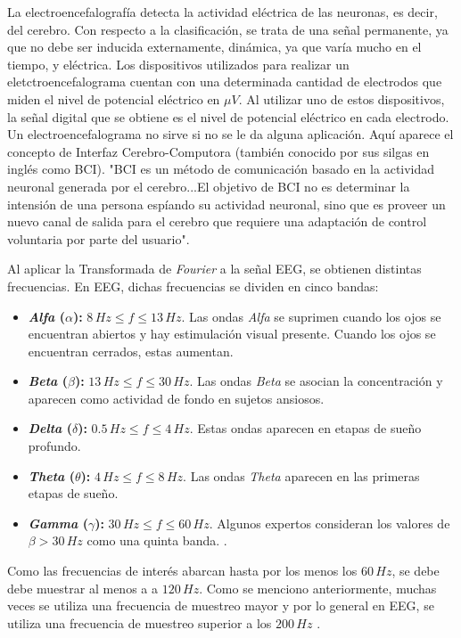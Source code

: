 La electroencefalografía detecta la actividad eléctrica de las neuronas, es decir, del cerebro. Con respecto a la clasificación, se trata de una señal permanente, ya que no debe ser inducida externamente, dinámica, ya que varía mucho en el tiempo, y eléctrica. Los dispositivos utilizados para realizar un eletctroencefalograma cuentan con una determinada cantidad de electrodos que miden el nivel de potencial eléctrico en $ \mu V$. Al utilizar uno de estos dispositivos, la señal digital que se obtiene es el nivel de potencial eléctrico en cada electrodo. Un electroencefalograma no sirve si no se le da alguna aplicación. Aquí aparece el concepto de Interfaz Cerebro-Computora (también conocido por sus silgas en inglés como BCI). "BCI es un método de comunicación basado en la actividad neuronal generada por el cerebro...El objetivo de BCI no es determinar la intensión de una persona espíando su actividad neuronal, sino que es proveer un nuevo canal de salida para el cerebro que requiere una adaptación de control voluntaria por parte del usuario"\cite{neural-eng}.

Al aplicar la Transformada de \emph{Fourier} a la señal EEG, se obtienen distintas frecuencias. En EEG, dichas frecuencias se dividen en cinco bandas:

\begin{itemize}
 \item \textbf{\emph{Alfa} ($\alpha$):} $ 8 \, Hz \leq f \leq 13 \, Hz$. Las ondas \emph{Alfa} se suprimen cuando los ojos se encuentran abiertos y hay estimulación visual presente. Cuando los ojos se encuentran cerrados, estas aumentan.
 \item \textbf{\emph{Beta} ($\beta$):} $ 13 \, Hz \leq f \leq 30 \, Hz$. Las ondas \emph{Beta} se asocian la concentración y aparecen como actividad de fondo en sujetos ansiosos. 
 \item \textbf{\emph{Delta} ($\delta$):} $ 0.5 \, Hz \leq f \leq 4 \, Hz$. Estas ondas aparecen en etapas de sueño profundo.
 \item \textbf{\emph{Theta} ($\theta$):} $ 4 \, Hz \leq f \leq 8 \, Hz$. Las ondas \emph{Theta} aparecen en las primeras etapas de sueño.
 \item \textbf{\emph{Gamma} ($\gamma$):} $ 30 \, Hz \leq f \leq 60 \, Hz $. Algunos expertos consideran los valores de $\beta > 30 \, Hz $ como una quinta banda. \cite{neural-eng}.
\end{itemize}

Como las frecuencias de interés abarcan hasta por los menos los $60 \, Hz$, se debe debe muestrar al menos a a $120 \, Hz$. Como se menciono anteriormente, muchas veces se utiliza una frecuencia de muestreo mayor y por lo general en EEG, se utiliza una frecuencia de muestreo superior a los $200 \, Hz$ \cite{neural-eng}.

